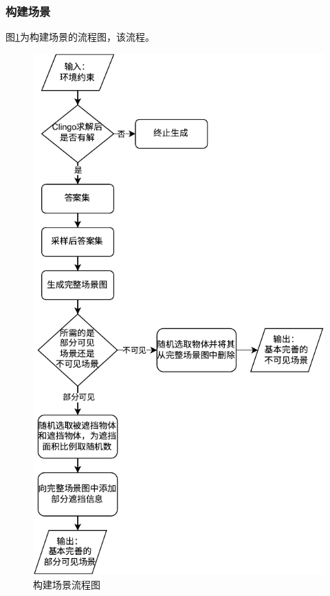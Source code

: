 \subsubsection{构建场景}
图\ref{fig:construct-scene}为构建场景的流程图，该流程。
\begin{figure}[h]
\centering
\includegraphics[scale=0.9]{figures/构建场景流程图-crop.pdf}
\caption{构建场景流程图}
\label{fig:construct-scene}
\end{figure}

